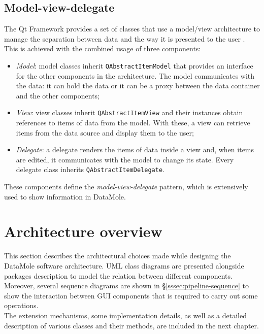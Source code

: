 \subsection{Model-view-delegate}
The Qt Framework provides a set of classes that use a model/view architecture to manage the separation between data and the way it is presented to the user \cite{site:qt-doc-model-view}.
This is achieved with the combined usage of three components:
\begin{itemize}
	\item \textit{Model}: model classes inherit \texttt{QAbstractItemModel} that provides an interface for the other components in the architecture. The model communicates with the data: it can hold the data or it can be a proxy between the data container and the other components;
	\item \textit{View}: view classes inherit \texttt{QAbstractItemView} and their instances obtain references to items of data from the model. With these, a view can retrieve items from the data source and display them to the user;
	\item \textit{Delegate}: a delegate renders the items of data inside a view and, when items are edited, it communicates with the model to change its state. Every delegate class inherits \texttt{QAbstractItemDelegate}.
\end{itemize}
These components define the \textit{model-view-delegate} pattern, which is extensively used to show information in DataMole.

\section{Architecture overview}
\label{sec:architecture}
This section describes the architectural choices made while designing the DataMole software architecture. UML class diagrams are presented alongside packages description to model the relation between different components. Moreover, several sequence diagrams are shown in §\ref{sssec:pipeline-sequence} to show the interaction between GUI components that is required to carry out some operations.\\
The extension mechanisms, some implementation details, as well as a detailed description of various classes and their methods, are included in the next chapter.

